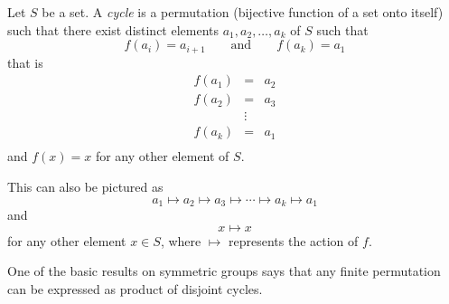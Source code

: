 \documentclass{article}
\begin{document}
Let $S$ be a set. A \emph{cycle} is a permutation
(bijective function of a set onto itself)
such that there exist distinct elements $a_1, a_2,\ldots,a_k$ of $S$
such that
$$f(a_i) = a_{i+1}\qquad \mbox{and}\qquad f(a_k)=a_1$$
that is
\begin{eqnarray*}
f(a_1)&=&a_{2}\\
f(a_{2})&=&a_{3}\\
&\vdots&\\
f(a_{k})&=&a_{1}\\
\end{eqnarray*}
and $f(x)=x$ for any other element of $S$.

This can also be pictured as
$$a_1\mapsto a_{2}\mapsto a_{3}\mapsto\cdots\mapsto a_{k}\mapsto a_{1}$$
and $$x\mapsto x$$ 
for any other element $x\in S$, where $\mapsto$ represents the action of $f$.

One of the basic results on symmetric groups
says that any finite permutation can be expressed as product of disjoint cycles.
\end{document}
